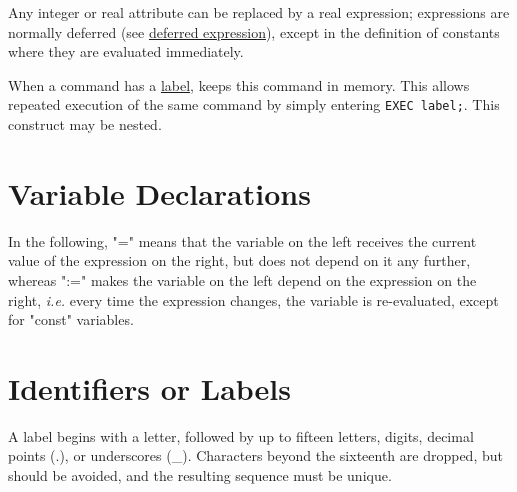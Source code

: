 Any integer or real attribute can be replaced by a real expression;
expressions are normally deferred (see
\hyperref[sec:defer]{deferred expression}), except in the   
definition of constants where they are evaluated immediately.

When a command has a \hyperref[sec:label]{label}, \madx keeps this
command in memory. This allows repeated execution of the same command by
simply entering \texttt{EXEC label;}. This construct may be nested. 



\section{Variable Declarations}
\label{subsec:var_declarations}

In the following, "=" means that the variable on the left receives the
current value of the expression on the right, but does not depend on it
any further, whereas ":=" makes the variable on the left depend on the
expression on the right, \textsl{i.e.} every time the expression
changes, the variable is re-evaluated, except for "const" variables.



\section{Identifiers or Labels}
\label{sec:label}
A label begins with a letter, followed by up to fifteen letters, digits,
decimal points (.), or underscores (\_). Characters beyond the sixteenth
are dropped, but should be avoided, and the resulting sequence must be
unique. 

